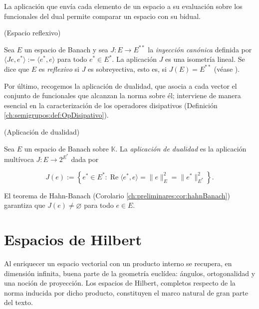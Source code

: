 La aplicación que envía cada elemento de un espacio a su evaluación sobre los
funcionales del dual permite comparar un espacio con su bidual.\\

\begin{Definicion}{(Espacio reflexivo)}
\label{ch:preliminares:def:reflexivo}

Sea $E$ un espacio de Banach y sea $J : E \rightarrow E^{**}$ la
\textit{inyección canónica} definida por
$\langle J e, e^* \rangle := \langle e^*, e \rangle$ para todo $e^* \in E^*$. La
aplicación $J$ es una isometría lineal. Se dice que $E$ es \textit{reflexivo} si
$J$ es sobreyectiva, esto es, si $J(E) = E^{**}$
(véase \cite[Cap.~3]{brezis-2011-fun-ana-sob}).
\end{Definicion}

Por último, recogemos la aplicación de dualidad, que asocia a cada vector el
conjunto de funcionales que alcanzan la norma sobre él; interviene de manera
esencial en la caracterización de los operadores disipativos
(Definición \ref{ch:semigrupos:def:OpDisipativo}).\\

\begin{Definicion}{(Aplicación de dualidad)}
\label{ch:preliminares:def:dualidad}

Sea $E$ un espacio de Banach sobre $\mathbb{K}$. La \textit{aplicación de
dualidad} es la aplicación multívoca $J : E \rightarrow 2^{E^*}$ dada por

\[J(e) := \left\{ e^* \in E^* : \operatorname{Re}\langle e^*, e \rangle = \lVert e \rVert_E^2 = \lVert e^* \rVert_{E^*}^2 \right\}.\]

El teorema de Hahn-Banach (Corolario \ref{ch:preliminares:cor:hahnBanach}) garantiza
que $J(e) \neq \varnothing$ para todo $e \in E$.
\end{Definicion}

\section{Espacios de Hilbert}
\label{ch:preliminares:section:Hilbert}

Al enriquecer un espacio vectorial con un producto interno se recupera, en
dimensión infinita, buena parte de la geometría euclídea: ángulos, ortogonalidad
y una noción de proyección. Los espacios de Hilbert, completos respecto de la
norma inducida por dicho producto, constituyen el marco natural de gran parte del
texto.\\

